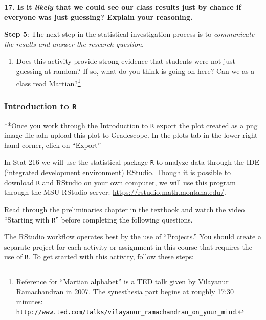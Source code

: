 \documentclass[
]{report}
\providecommand{\tightlist}{%
  \setlength{\itemsep}{0pt}\setlength{\parskip}{0pt}}
\begin{document}
\vspace{.5in}

\textbf{17. Is it \emph{likely} that we could see our class results just by chance if everyone was just guessing? Explain your reasoning.}

\vspace{.5in}

\textbf{Step 5}: The next step in the statistical investigation process is to \emph{communicate the results and answer the research question}.

\begin{enumerate}
\def\labelenumi{\arabic{enumi}.}
\setcounter{enumi}{17}
\tightlist
\item
  Does this activity provide strong evidence that students were not just guessing at random? If so, what do you think is going on here? Can we as a class read Martian?\footnote{Reference for ``Martian alphabet'' is a TED talk given by Vilayanur Ramachandran in 2007. The synesthesia part begins at roughly 17:30 minutes: \texttt{http://www.ted.com/talks/vilayanur\_ramachandran\_on\_your\_mind}.}
\end{enumerate}

\vspace{1in}

\newpage

\hypertarget{introduction-to-r}{%
\subsubsection*{\texorpdfstring{Introduction to \texttt{R}}{Introduction to R}}\label{introduction-to-r}}

**Once you work through the Introduction to \texttt{R} export the plot created as a png image file adn upload this plot to Gradescope. In the plots tab in the lower right hand corner, click on ``Export''

In Stat 216 we will use the statistical package \texttt{R} to analyze data through the IDE (integrated development environment) RStudio. Though it is possible to download \texttt{R} and RStudio on your own computer, we will use this program through the MSU RStudio server: \url{https://rstudio.math.montana.edu/}.

Read through the preliminaries chapter in the textbook and watch the video ``Starting with \texttt{R}'' before completing the following questions.

The RStudio workflow operates best by the use of ``Projects.'' You should create a separate project for each activity or assignment in this course that requires the use of \texttt{R}. To get started with this activity, follow these steps:
\end{document}
